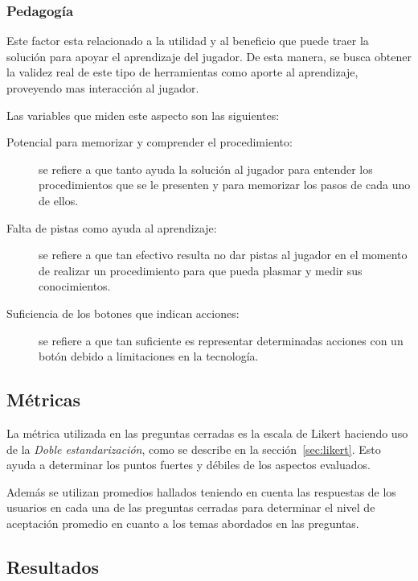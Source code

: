 \subsubsection{Pedagogía}
\label{sec:sub_pedagogia}

Este factor esta relacionado a la utilidad y al beneficio que puede traer la
solución para apoyar el aprendizaje del jugador. De esta manera, se busca
obtener la validez real de este tipo de herramientas como aporte al aprendizaje,
proveyendo mas interacción al jugador.

Las variables que miden este aspecto son las siguientes:

\begin{description}

\item[Potencial para memorizar y comprender el procedimiento:] se refiere a
    que tanto ayuda la solución al jugador para entender los procedimientos que se
    le presenten y para memorizar los pasos de cada uno de ellos.

\item[Falta de pistas como ayuda al aprendizaje:] se refiere a que tan efectivo
    resulta no dar pistas al jugador en el momento de realizar un procedimiento
    para que pueda plasmar y medir sus conocimientos.

\item[Suficiencia de los botones que indican acciones:] se refiere a que tan
    suficiente es representar determinadas acciones  con un botón debido a
    limitaciones en la tecnología.

\end{description}


\subsection{Métricas}

La métrica utilizada en las preguntas cerradas es la escala de Likert haciendo
uso de la \emph{Doble estandarización}, como se describe en la
sección~\ref{sec:likert}. Esto ayuda a determinar los puntos fuertes y débiles
de los aspectos evaluados.

Además se utilizan promedios hallados teniendo en cuenta las respuestas de los
usuarios en cada una de las preguntas cerradas para determinar el nivel de
aceptación promedio en cuanto a los temas abordados en las preguntas.




\subsection{Resultados}
\label{sec:res_subjetiva}

